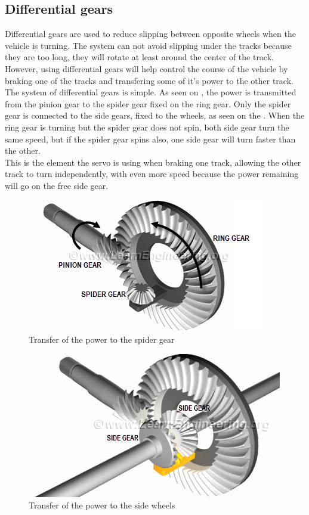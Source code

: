 \subsection{Differential gears}

Differential gears are used to reduce slipping between opposite wheels when the vehicle is turning. The system can not avoid slipping under the tracks because they are too long, they will rotate at least around the center of the track. However, using differential gears will help control the course of the vehicle by braking one of the tracks and transfering some of it's power to the other track.\\

The system of differential gears is simple. As seen on , the power is transmitted from the pinion gear to the spider gear fixed on the ring gear. Only the spider gear is connected to the side gears, fixed to the wheels, as seen on the . When the ring gear is turning but the spider gear does not spin, both side gear turn the same speed, but if the spider gear spins also, one side gear will turn faster than the other.\\

This is the element the servo is using when braking one track, allowing the other track to turn independently, with even more speed because the power remaining will go on the free side gear.\\


\begin{figure}[H]
	\centering
	\includegraphics[scale=1]{figures/pinion-ring-spider_gear.jpg}
	\caption{Transfer of the power to the spider gear}
	\label{pinion-ring-spider_gear}
\end{figure}

\begin{figure}[H]
	\centering
	\includegraphics[scale=1]{figures/full_differential_gears.jpg}
	\caption{Transfer of the power to the side wheels}
	\label{full_differential_gears}
\end{figure}
